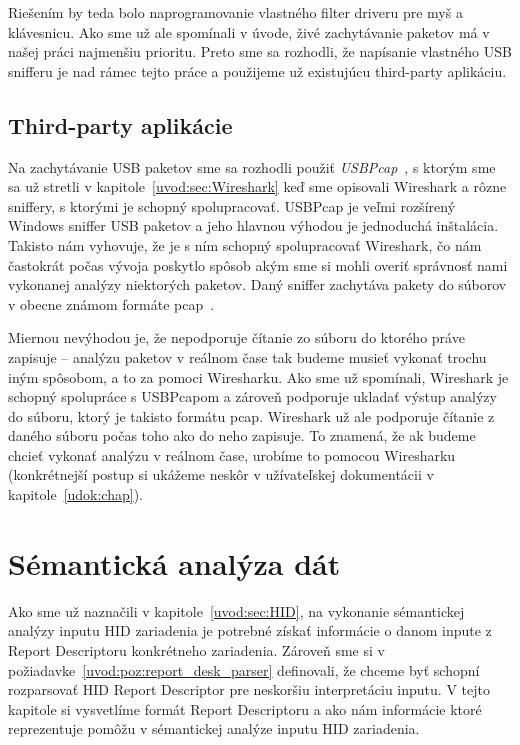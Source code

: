 Riešením by teda bolo naprogramovanie vlastného filter driveru pre myš a klávesnicu. Ako sme už ale spomínali v úvode, živé zachytávanie paketov má v našej práci najmenšiu prioritu. Preto sme sa rozhodli, že napísanie vlastného USB snifferu je nad rámec tejto práce a použijeme už existujúcu third-party aplikáciu.

\subsection*{Third-party aplikácie}
\label{kap03:third_party}
Na zachytávanie USB paketov sme sa rozhodli použiť \textit{USBPcap}~\cite{usbpcap}, s ktorým sme sa už stretli v kapitole~\ref{uvod:sec:Wireshark} keď sme opisovali Wireshark a rôzne sniffery, s ktorými je schopný spolupracovať. USBPcap je veľmi rozšírený Windows sniffer USB paketov a jeho hlavnou výhodou je jednoduchá inštalácia. Takisto nám vyhovuje, že je s ním schopný spolupracovať Wireshark, čo nám častokrát počas vývoja poskytlo spôsob akým sme si mohli overiť správnosť nami vykonanej analýzy niektorých paketov. Daný sniffer zachytáva pakety do súborov v obecne známom formáte pcap~\cite{pcap}.  

Miernou nevýhodou je, že nepodporuje čítanie zo súboru do ktorého práve zapisuje -- analýzu paketov v reálnom čase tak budeme musieť vykonať trochu iným spôsobom, a to za pomoci Wiresharku. Ako sme už spomínali, Wireshark je schopný spolupráce s USBPcapom a zároveň podporuje ukladať výstup analýzy do súboru, ktorý je takisto formátu pcap. Wireshark už ale podporuje čítanie z daného súboru počas toho ako do neho zapisuje. To znamená, že ak budeme chcieť vykonať analýzu v reálnom čase, urobíme to pomocou Wiresharku (konkrétnejší postup si ukážeme neskôr v užívateľskej dokumentácii v kapitole~\ref{udok:chap}).



\section{Sémantická analýza dát}
Ako sme už naznačili v kapitole~\ref{uvod:sec:HID}, na vykonanie sémantickej analýzy inputu HID zariadenia je potrebné získať informácie o danom inpute z Report Descriptoru konkrétneho zariadenia. Zároveň sme si v požiadavke~\ref{uvod:poz:report_desk_parser} definovali, že chceme byť schopní rozparsovať HID Report Descriptor pre neskoršiu interpretáciu inputu. V tejto kapitole si vysvetlíme formát Report Descriptoru a ako nám informácie ktoré reprezentuje pomôžu v sémantickej analýze inputu HID zariadenia.

